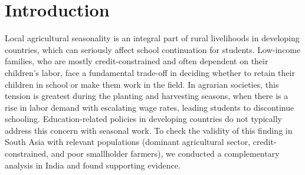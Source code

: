 \documentclass[12pt,letterpaper]{article}
\newcommand{\0}{\ensuremath{\mbox{\boldmath $0$}}}
\begin{document}
\begin{abstract}
\vspace{-0.5em}


\end{abstract}

\doublespacing

\pagebreak

\normalsize





\section{Introduction}

Local agricultural seasonality is an integral part of rural livelihoods in developing countries, which can seriously affect school continuation for students. Low-income families, who are mostly credit-constrained and often dependent on their children's labor, face a fundamental trade-off in deciding whether to retain their children in school or make them work in the field. In agrarian societies, this tension is greatest during the planting and harvesting seasons, when there is a rise in labor demand with escalating wage rates, leading students to discontinue schooling. Education-related policies in developing countries do not typically address this concern with seasonal work. To check the validity of this finding in South Asia with relevant populations (dominant agricultural sector, credit-constrained, and poor smallholder farmers), we conducted a complementary analysis in India and found supporting evidence. 
\end{document}
